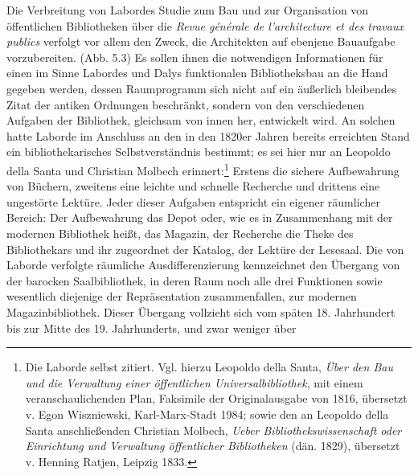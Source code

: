 Die Verbreitung von Labordes Studie zum Bau und zur Organisation von
öffentlichen Bibliotheken über die \emph{Revue générale de
l'architecture et des travaux publics} verfolgt vor allem den Zweck, die
Architekten auf ebenjene Bauaufgabe vorzubereiten. (Abb. 5.3) Es sollen
ihnen die notwendigen Informationen für einen im Sinne Labordes und
Dalys funktionalen Bibliotheksbau an die Hand gegeben werden, dessen
Raumprogramm sich nicht auf ein äußerlich bleibendes Zitat der antiken
Ordnungen beschränkt, sondern von den verschiedenen Aufgaben der
Bibliothek, gleichsam von innen her, entwickelt wird. An solchen hatte
Laborde im Anschluss an den in den 1820er Jahren bereits erreichten
Stand ein bibliothekarisches Selbstverständnis bestimmt; es sei hier nur
an Leopoldo della Santa und Christian Molbech erinnert:\footnote{Die
  Laborde selbst zitiert. Vgl. hierzu Leopoldo della Santa, \emph{Über
  den Bau und die Verwaltung einer öffentlichen Universalbibliothek},
  mit einem veranschaulichenden Plan, Faksimile der Originalausgabe von
  1816, übersetzt v. Egon Wiszniewski, Karl-Marx-Stadt 1984; sowie den
  an Leopoldo della Santa anschließenden Christian Molbech, \emph{Ueber
  Bibliothekswissenschaft oder Einrichtung und Verwaltung öffentlicher
  Bibliotheken} (dän. 1829), übersetzt v. Henning Ratjen, Leipzig 1833.}
Erstens die sichere Aufbewahrung von Büchern, zweitens eine leichte und
schnelle Recherche und drittens eine ungestörte Lektüre. Jeder dieser
Aufgaben entspricht ein eigener räumlicher Bereich: Der Aufbewahrung das
Depot oder, wie es in Zusammenhang mit der modernen Bibliothek heißt,
das Magazin, der Recherche die Theke des Bibliothekars und ihr
zugeordnet der Katalog, der Lektüre der Lesesaal. Die von Laborde
verfolgte räumliche Ausdifferenzierung kennzeichnet den Übergang von der
barocken Saalbibliothek, in deren Raum noch alle drei Funktionen sowie
wesentlich diejenige der Repräsentation zusammenfallen, zur modernen
Magazinbibliothek. Dieser Übergang vollzieht sich vom späten 18.
Jahrhundert bis zur Mitte des 19. Jahrhunderts, und zwar weniger über

